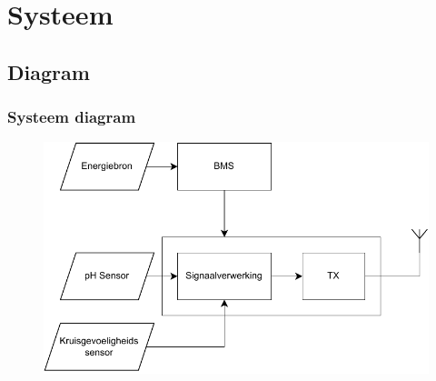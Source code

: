 \section{Systeem}

\subsection*{Diagram}
\begin{frame}
    \frametitle{Systeem diagram}
    
    \begin{figure}
        \centering
        \includegraphics[width=\textwidth]{img/system.pdf}
    \end{figure}
    
\end{frame}

